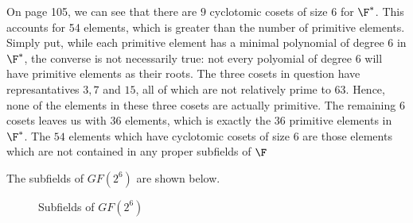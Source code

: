 \documentclass{homework}
\begin{document}
\begin{problem}
  On page 105, we can see that there are $9$ cyclotomic cosets of size $6$ for
  $\F^*$. This accounts for 54 elements, which is greater than the number of
  primitive elements. Simply put, while each primitive element has a minimal
  polynomial of degree 6 in $\F^*$, the converse is not necessarily true: not every
  polyomial of degree 6 will have primitive elements as their roots.
  The three cosets in question have represantatives $3,7 $ and $15$, all of
  which are not relatively prime to $63$. Hence, none of the elements in these
  three cosets are actually primitive. The remaining 6 cosets leaves us with
  $36$ elements, which is exactly the $36$ primitive elements in $\F^*$. The $54$
  elements which have cyclotomic cosets of size $6$ are those elements which are
  not contained in any proper subfields of $\F$
\end{problem}

\begin{problem}
  The subfields of $GF(2^6)$ are shown below.
  \begin{figure}[h!]
    \begin{center}
    \end{center}
    \caption{Subfields of $GF(2^6)$}
    \label{fig:}
  \end{figure}

\end{problem}
\end{document}
